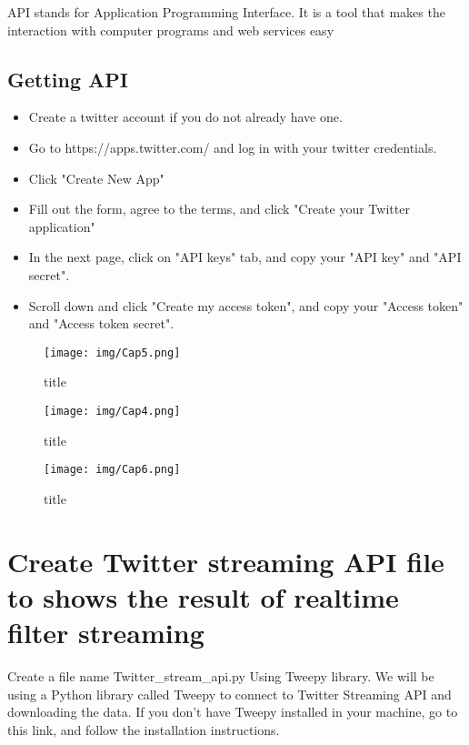 \documentclass[11pt]{article}
\makeatletter
\def\maxwidth{\ifdim\Gin@nat@width>\linewidth\linewidth
    \else\Gin@nat@width\fi}
\let\Oldincludegraphics\includegraphics
\renewcommand{\includegraphics}[1]{\Oldincludegraphics[width=.8\maxwidth]{#1}}
\providecommand{\tightlist}{%
      \setlength{\itemsep}{0pt}\setlength{\parskip}{0pt}}
\makeatother
\begin{document}
    API stands for Application Programming Interface. It is a tool that
makes the interaction with computer programs and web services easy

    \subsection{Getting API}\label{getting-api}

\begin{itemize}
\tightlist
\item
  Create a twitter account if you do not already have one.
\item
  Go to https://apps.twitter.com/ and log in with your twitter
  credentials.
\item
  Click "Create New App"
\item
  Fill out the form, agree to the terms, and click "Create your Twitter
  application"
\item
  In the next page, click on "API keys" tab, and copy your "API key" and
  "API secret".
\item
  Scroll down and click "Create my access token", and copy your "Access
  token" and "Access token secret".
\end{itemize}

    \begin{figure}
\centering
\texttt{[image: img/Cap5.png]}
\caption{title}
\end{figure}

    \begin{figure}
\centering
\texttt{[image: img/Cap4.png]}
\caption{title}
\end{figure}

    \begin{figure}
\centering
\texttt{[image: img/Cap6.png]}
\caption{title}
\end{figure}

    \section{Create Twitter streaming API file to shows the result of
realtime filter
streaming}\label{create-twitter-streaming-api-file-to-shows-the-result-of-realtime-filter-streaming}

    Create a file name Twitter\_stream\_api.py Using Tweepy library. We will
be using a Python library called Tweepy to connect to Twitter Streaming
API and downloading the data. If you don't have Tweepy installed in your
machine, go to this link, and follow the installation instructions.
\end{document}
